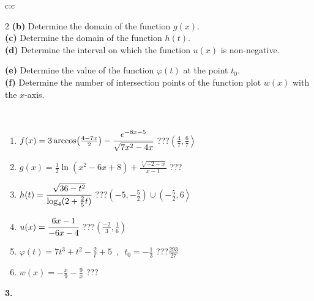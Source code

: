 \documentclass[10pt]{report}
\begin{document}
\begin{tabular}{c:c}
\begin{minipage}[c][104.5mm][t]{0.5\linewidth}
\begin{center}
\begin{minipage}{0.95\linewidth}
\begin{center}
{\begin{multicols}{2}
\textbf{(b)} Determine the domain of the function \(g(x)\). \\[1mm]
\textbf{(c)} Determine the domain of the function \(h(t)\). \\[1mm]
\textbf{(d)} Determine the interval on which the function \(u(x)\) is non-negative. \par \columnbreak
\textbf{(e)} Determine the value of the function \(\varphi(t)\) at the point \(t_0\). \\[1mm]
\textbf{(f)} Determine the number of intersection points of the function plot \(w(x)\) with the \(x\)-axis. \\[1mm]
\end{multicols}
}
\end{center}
\end{minipage}
\\[4mm]
\begin{minipage}{0.79\linewidth}
\begin{center}
\begin{varwidth}{\linewidth}
\begin{enumerate}
\small
\item $f(x) = 3\arccos\!\left( \frac{4-7x}{2} \right) - \cfrac{e^{-8x-5}}{\sqrt{7x^2-4x}}$\quad \dotfill\; ???\;\dotfill \quad $\left(\frac{4}{7} , \frac{6}{7}\right\rangle$
\item $g(x) = \frac{1}{2} \ln{\!(x^2-6x+8)}+\frac{\sqrt[3]{-2-x}}{x-1}$\quad \dotfill\; ???\;\dotfill {}
\item $h(t) = \cfrac{\sqrt{36-t^2}}{\log_4(2+\frac{2}{5}t)}$\quad \dotfill\; ???\;\dotfill \quad $\left(-5 , -\frac{5}{2}\right)\cup\left(-\frac{5}{2} , 6\right\rangle$
\item $u(x) = \cfrac{6x-1}{-6x-4}$\quad \dotfill\; ???\;\dotfill \quad $\left(\frac{-2}{3} , \frac{1}{6}\right)$
\item $\varphi(t) = 7t^3+t^2-\frac{2}{t}+5 \enspace , \enspace t_0=-\frac{1}{3}$\quad \dotfill\; ???\;\dotfill \quad $\frac{293}{27}$
\item $w(x) = -\frac{x}{9}-\frac{9}{x}$\quad \dotfill\; ???\;\dotfill {}
\end{enumerate}
\end{varwidth}
\end{center}
\end{minipage}
\begin{minipage}{0.20\linewidth}
\begin{center}
{\Huge\bfseries 3.} \\[2mm]

\end{center}
\end{minipage}
\end{center}
\end{minipage}
\end{tabular}
\end{document}
